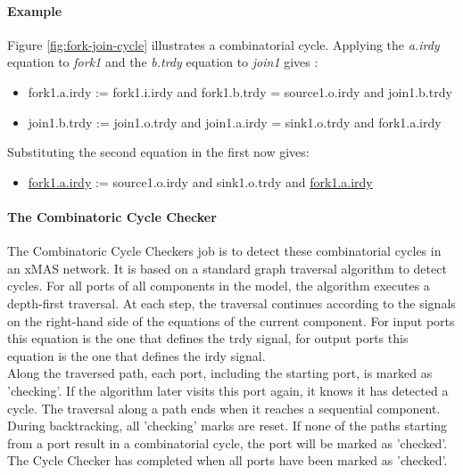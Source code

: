 \documentclass[a4paper,11pt]{article}
\begin{document}
\paragraph{Example}
Figure \ref{fig:fork-join-cycle} illustrates a combinatorial cycle. Applying the \emph{a.irdy} equation
to \emph{fork1} and the \emph{b.trdy} equation to \emph{join1} gives \cite[p.~44]{chatterjee10}:
\begin{itemize}
 \item fork1.a.irdy := fork1.i.irdy and fork1.b.trdy = source1.o.irdy and join1.b.trdy
 \item join1.b.trdy := join1.o.trdy and join1.a.irdy = sink1.o.trdy and fork1.a.irdy
\end{itemize}
Substituting the second equation in the first now gives:
\begin{itemize}
 \item \underline{fork1.a.irdy} := source1.o.irdy and sink1.o.trdy and \underline{fork1.a.irdy}
\end{itemize}







\paragraph{The Combinatoric Cycle Checker}
The Combinatoric Cycle Checkers job is to detect these combinatorial cycles in an xMAS network.
It is based on a standard graph traversal algorithm to detect cycles. For all ports of all
components in the model, the algorithm executes a depth-first traversal. At each step, the
traversal continues according to the signals on the right-hand side of the equations
of the current component. For input ports this equation is the one that defines
the trdy signal, for output ports this equation is the one that defines the irdy signal.\\
Along the traversed path, each port, including the starting port, is marked as 'checking'.
If the algorithm later visits this port again, it knows it has detected a cycle.
The traversal along a path ends when it reaches a sequential component. During backtracking,
all 'checking' marks are reset. If none of the paths starting from a port result in a
combinatorial cycle, the port will be marked as 'checked'. The Cycle Checker has completed
when all ports have been marked as 'checked'.
\end{document}
